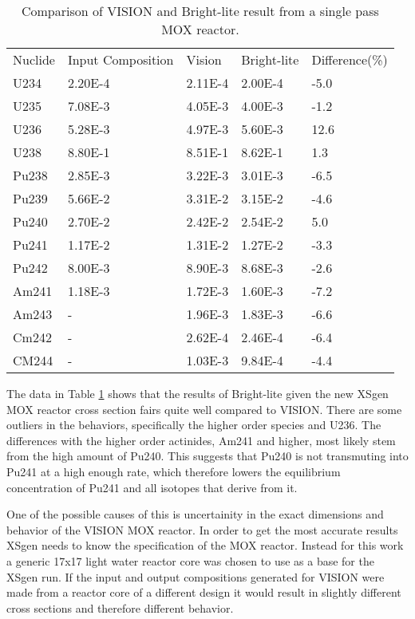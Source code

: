 \documentclass{article}
\begin{document}
\begin{table}[!htb]
\centering
\caption{Comparison of VISION and Bright-lite result from a single pass MOX reactor.}
\label{tab:g}
\begin{tabular}{lllll}
Nuclide & Input Composition & Vision & Bright-lite & Difference(\%) \\
U234 & 2.20E-4 & 2.11E-4 & 2.00E-4 & -5.0\\
U235 & 7.08E-3 & 4.05E-3 & 4.00E-3 & -1.2\\
U236 & 5.28E-3 & 4.97E-3 & 5.60E-3 & 12.6\\
U238 & 8.80E-1 & 8.51E-1 & 8.62E-1 & 1.3\\
Pu238 & 2.85E-3 & 3.22E-3 & 3.01E-3 & -6.5\\
Pu239 & 5.66E-2 & 3.31E-2 & 3.15E-2 & -4.6\\
Pu240 & 2.70E-2 & 2.42E-2 & 2.54E-2 & 5.0\\
Pu241 & 1.17E-2 & 1.31E-2 & 1.27E-2 & -3.3\\
Pu242 & 8.00E-3 & 8.90E-3 & 8.68E-3 & -2.6\\
Am241 & 1.18E-3 & 1.72E-3 & 1.60E-3 & -7.2\\
Am243 & - & 1.96E-3 & 1.83E-3 & -6.6\\
Cm242 & - & 2.62E-4 & 2.46E-4 & -6.4\\
CM244 & - & 1.03E-3 & 9.84E-4 & -4.4
\end{tabular}
\end{table}

The data in Table \ref{tab:g} shows that the results of Bright-lite given the new XSgen MOX reactor cross section fairs quite well compared to VISION. There are some outliers in the behaviors, specifically the higher order species and U236. The differences with the higher order actinides, Am241 and higher, most likely stem from the high amount of Pu240. This suggests that Pu240 is not transmuting into Pu241 at a high enough rate, which therefore lowers the equilibrium concentration of Pu241 and all isotopes that derive from it.

One of the possible causes of this is uncertainity in the exact dimensions and behavior of the VISION MOX reactor. In order to get the most accurate results XSgen needs to know the specification of the MOX reactor. Instead for this work a generic 17x17 light water reactor core was chosen to use as a base for the XSgen run. If the input and output compositions generated for VISION were made from a reactor core of a different design it would result in slightly different cross sections and therefore different behavior.
\end{document}
